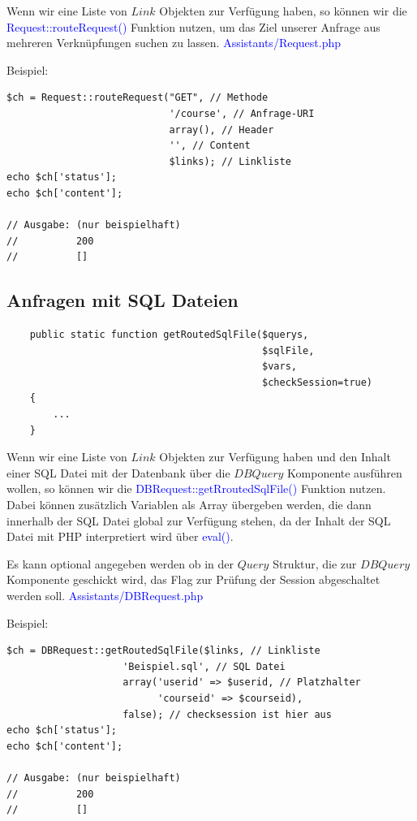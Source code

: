 \documentclass[10pt,a4paper,final,parskip]{scrartcl}
\newcommand{\blau}[1]{\textcolor{blue}{#1}}
\begin{document}
Wenn wir eine Liste von $Link$ Objekten zur Verfügung haben, so können wir die \blau{Request::routeRequest()} Funktion nutzen, um das Ziel unserer Anfrage aus mehreren Verknüpfungen suchen zu lassen.
\blau{Assistants/Request.php}

\begin{minipage}{\textwidth}
Beispiel:
\begin{lstlisting}
$ch = Request::routeRequest("GET", // Methode
                            '/course', // Anfrage-URI
                            array(), // Header
                            '', // Content
                            $links); // Linkliste
echo $ch['status'];
echo $ch['content']; 
                     
// Ausgabe: (nur beispielhaft)
//          200
//          []
\end{lstlisting}
\end{minipage}

\subsection{Anfragen mit SQL Dateien}
\begin{minipage}{\textwidth}
\begin{lstlisting}
    public static function getRoutedSqlFile($querys, 
                                            $sqlFile, 
                                            $vars,
                                            $checkSession=true)
    {
    	...
    }
\end{lstlisting}
\end{minipage}
Wenn wir eine Liste von $Link$ Objekten zur Verfügung haben und den Inhalt einer SQL Datei mit der Datenbank über die $DBQuery$ Komponente ausführen wollen, so können wir die \blau{DBRequest::getRroutedSqlFile()} Funktion nutzen.
Dabei können zusätzlich Variablen als Array übergeben werden, die dann innerhalb der SQL Datei global zur Verfügung stehen, da der Inhalt der SQL Datei mit PHP interpretiert wird über \blau{eval()}.

Es kann optional angegeben werden ob in der $Query$ Struktur, die zur $DBQuery$ Komponente geschickt wird, das Flag zur Prüfung der Session abgeschaltet werden soll.
\blau{Assistants/DBRequest.php}

\begin{minipage}{\textwidth}
Beispiel:
\begin{lstlisting}
$ch = DBRequest::getRoutedSqlFile($links, // Linkliste
                    'Beispiel.sql', // SQL Datei
                    array('userid' => $userid, // Platzhalter
                          'courseid' => $courseid),
                    false); // checksession ist hier aus
echo $ch['status'];
echo $ch['content']; 
                     
// Ausgabe: (nur beispielhaft)
//          200
//          []
\end{lstlisting}
\end{minipage}
\end{document}
